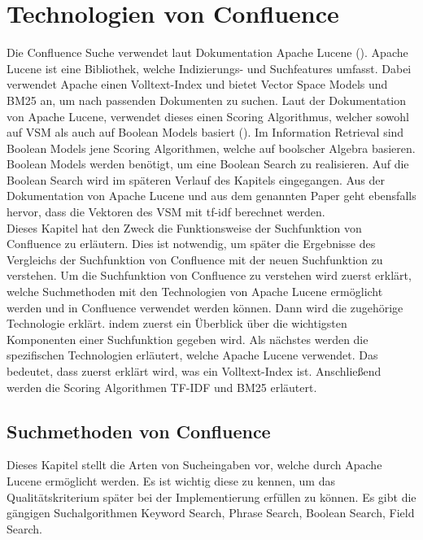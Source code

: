 \chapter{Technologien von Confluence}
\label{chap:technologie-von-confluence}
Die Confluence Suche verwendet laut Dokumentation Apache Lucene (\cite{Confluence_Ranking}).
Apache Lucene ist eine Bibliothek, welche Indizierungs- und Suchfeatures umfasst.
Dabei verwendet Apache einen Volltext-Index und bietet Vector Space Models und BM25 an, um nach passenden Dokumenten zu suchen.
Laut der Dokumentation von Apache Lucene, verwendet dieses einen Scoring Algorithmus, welcher sowohl auf VSM als auch auf Boolean Models basiert (\cite{Lucene_Scoring}).
Im Information Retrieval sind Boolean Models jene Scoring Algorithmen, welche auf boolscher Algebra basieren.
Boolean Models werden benötigt, um eine Boolean Search zu realisieren.
Auf die Boolean Search wird im späteren Verlauf des Kapitels eingegangen.
Aus der Dokumentation von Apache Lucene und aus dem genannten Paper geht ebensfalls hervor, dass die Vektoren des VSM mit tf-idf berechnet werden.\\

Dieses Kapitel hat den Zweck die Funktionsweise der Suchfunktion von Confluence zu erläutern.
Dies ist notwendig, um später die Ergebnisse des Vergleichs der Suchfunktion von Confluence mit der neuen Suchfunktion zu verstehen.
Um die Suchfunktion von Confluence zu verstehen wird zuerst erklärt, welche Suchmethoden mit den Technologien von Apache Lucene ermöglicht werden und in Confluence verwendet werden können.
Dann wird die zugehörige Technologie erklärt. indem zuerst ein Überblick über die wichtigsten Komponenten einer Suchfunktion gegeben wird.
Als nächstes werden die spezifischen Technologien erläutert, welche Apache Lucene verwendet.
Das bedeutet, dass zuerst erklärt wird, was ein Volltext-Index ist.
Anschließend werden die Scoring Algorithmen TF-IDF und BM25 erläutert.

\section{Suchmethoden von Confluence}
\label{chap:suchmethoden-von-confluence}
Dieses Kapitel stellt die Arten von Sucheingaben vor, welche durch Apache Lucene ermöglicht werden.
Es ist wichtig diese zu kennen, um das Qualitätskriterium später bei der Implementierung erfüllen zu können.
Es gibt die gängigen Suchalgorithmen Keyword Search, Phrase Search, Boolean Search, Field Search.\\

